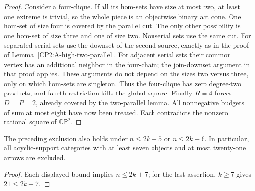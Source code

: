 \begin{proof}
Consider a four-clique.  If all its hom-sets have size at
most two, at least one extreme is trivial, so the whole
piece is an objectwise binary act cone.  One hom-set of
size four is covered by the parallel cut.  The only
other possibility is one hom-set of size three and one
of size two.  Nonserial sets use the same cut.  For
separated serial sets use the downset of the second
source, exactly as in the proof of
Lemma~\ref{CP2:A-high-two-parallel}.  For adjacent serial
sets their common vertex has an additional neighbor in
the four-chain; the join-downset argument in that proof
applies.  These arguments do not depend on the sizes
two versus three, only on which hom-sets are singleton.
Thus the four-clique has zero degree-two products, and
fourth restriction kills the global square.
Finally $R=4$ forces $D=P=2$, already covered by the
two-parallel lemma.  All nonnegative budgets of sum at
most eight have now been treated.  Each contradicts the
nonzero rational square of $\mathbb{CP}^2$.
\end{proof}

\begin{corollary}
\label{CP2:A-high-six-seven}
The preceding exclusion also holds under $n\leq2k+5$ or
$n\leq2k+6$.  In particular, all acyclic-support categories
with at least seven objects and at most twenty-one arrows
are excluded.
\end{corollary}
\begin{proof}
Each displayed bound implies $n\leq2k+7$; for the last
assertion, $k\geq7$ gives $21\leq2k+7$.
\end{proof}
